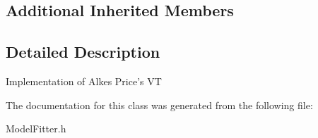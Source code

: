 \subsection*{Additional Inherited Members}


\subsection{Detailed Description}
Implementation of Alkes Price's V\-T 

The documentation for this class was generated from the following file\-:\begin{DoxyCompactItemize}
\item 
Model\-Fitter.\-h\end{DoxyCompactItemize}
